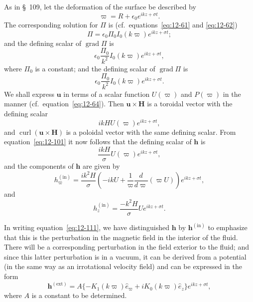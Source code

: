 As in \S~109, let the deformation of the surface be described by
\begin{equation}
\label{eq:12-104}
\varpi = R + \epsilon_0 e^{ikz+\sigma t}.
\end{equation}
The corresponding solution for $\Pi$ is (cf.\ equations~\eqref{eq:12-61} and \eqref{eq:12-62})
\begin{equation}
\label{eq:12-105}
\Pi = \epsilon_0 \Pi_0 I_0(k\varpi) e^{ikz+\sigma t};
\end{equation}
and the defining scalar of $\operatorname{grad}\Pi$ is
\begin{equation}
\label{eq:12-106}
\epsilon_0 \frac{\Pi_0}{k^2} I_0(k\varpi) e^{ikz+\sigma t},
\end{equation}
where $\Pi_0$ is a constant; and the defining scalar of $\operatorname{grad}\Pi$ is
\begin{equation}
\label{eq:12-107}
\epsilon_0 \frac{\Pi_0}{k^2} I_0(k\varpi) e^{ikz+\sigma t}.
\end{equation}
We shall express $\mathbf{u}$ in terms of a scalar function $U(\varpi)$ and $P(\varpi)$ in the manner (cf.\ equation~\eqref{eq:12-64}). Then $\mathbf{u} \times \mathbf{H}$ is a toroidal vector with the defining scalar
\begin{equation}
\label{eq:12-108}
ikHU(\varpi)e^{ikz+\sigma t},
\end{equation}
and $\operatorname{curl}(\mathbf{u} \times \mathbf{H})$ is a poloidal vector with the same defining scalar. From equation~\eqref{eq:12-101} it now follows that the defining scalar of $\mathbf{h}$ is
\begin{equation}
\label{eq:12-109}
\frac{ikH}{\sigma}U(\varpi)e^{ikz+\sigma t},
\end{equation}
and the components of $\mathbf{h}$ are given by
\begin{equation}
\label{eq:12-110}
h_\varpi^{(\mathrm{in})} = \frac{ik^2 H}{\sigma}\left(-ik U + \frac{1}{\varpi}\frac{d}{d\varpi}(\varpi U)\right)e^{ikz+\sigma t},
\end{equation}
and
\begin{equation}
\label{eq:12-111}
h_z^{(\mathrm{in})} = \frac{-k^2 H}{\sigma}U e^{ikz+\sigma t}.
\end{equation}

In writing equation~\eqref{eq:12-111}, we have distinguished $\mathbf{h}$ by $\mathbf{h}^{(\mathrm{in})}$ to emphasize that this is the perturbation in the magnetic field in the interior of the fluid. There will be a corresponding perturbation in the field exterior to the fluid; and since this latter perturbation is in a vacuum, it can be derived from a potential (in the same way as an irrotational velocity field) and can be expressed in the form
\begin{equation}
\label{eq:12-112}
\mathbf{h}^{(\mathrm{ext})} = A\{-K_1(k\varpi)\hat{e}_\varpi + iK_0(k\varpi)\hat{e}_z\}e^{ikz+\sigma t},
\end{equation}
where $A$ is a constant to be determined.

